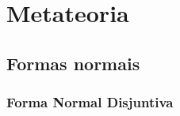 \part{Metateoria}
\label{ch.normalform}

\chapter{Formas normais}\label{c:NormalForms}


\section{Forma Normal Disjuntiva}\label{s:DNFDefined}

